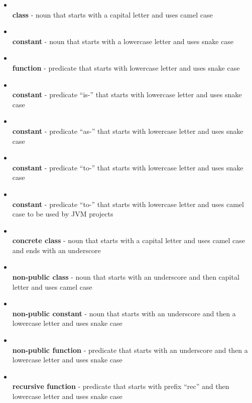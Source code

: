 \begin{itemize}
    \item {} \\
    \textbf{class} - noun that starts with a capital letter and uses camel case

    \item {} \\
    \textbf{constant} - noun that starts with a lowercase letter and uses snake case

    \item {} \\
    \textbf{function} - predicate that starts with lowercase letter and uses snake case

    \item {} \\
    \textbf{constant} - predicate ``is-'' that starts with lowercase letter and uses snake case

    \item {} \\
    \textbf{constant} - predicate ``as-'' that starts with lowercase letter and uses snake case

    \item {} \\
    \textbf{constant} - predicate ``to-'' that starts with lowercase letter and uses snake case

    \item {} \\
    \textbf{constant} - predicate ``to-'' that starts with lowercase letter and uses camel case to be used by JVM projects

    \item {} \\
    \textbf{concrete class} - noun that starts with a capital letter and uses camel case and ends with an underscore

    \item {} \\
    \textbf{non-public class} - noun that starts with an underscore and then capital letter and uses camel case

    \item {} \\
    \textbf{non-public constant} - noun that starts with an underscore and then a lowercase letter and uses snake case

    \item {} \\
    \textbf{non-public function} - predicate that starts with an underscore and then a lowercase letter and uses snake case

    \item {} \\
    \textbf{recursive function} - predicate that starts with prefix ``rec'' and then lowercase letter and uses snake case

\end{itemize}

